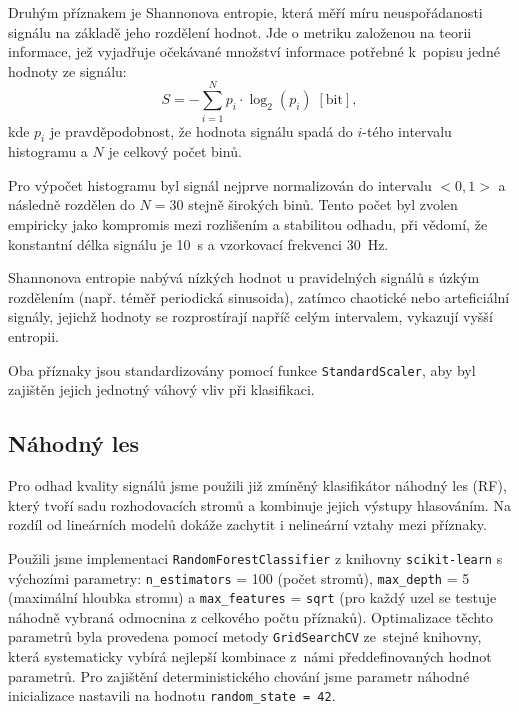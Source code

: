 Druhým příznakem je Shannonova entropie, která měří míru neuspořádanosti signálu na základě jeho rozdělení hodnot.
Jde o metriku založenou na teorii informace, jež vyjadřuje očekávané množství informace potřebné k~popisu jedné hodnoty ze signálu:
\begin{equation}
	\label{eq:shannon_entropy}
	S = - \sum_{i=1}^{N} p_i \cdot \log_2(p_i) \; [\text{bit}],
\end{equation}
kde $p_i$ je pravděpodobnost, že hodnota signálu spadá do $i$-tého intervalu histogramu a $N$ je celkový počet binů.

Pro výpočet histogramu byl signál nejprve normalizován do intervalu $< 0, 1 >$ a následně rozdělen do $N = 30$ stejně širokých binů.
Tento počet byl zvolen empiricky jako kompromis mezi rozlišením a stabilitou odhadu, při vědomí, že konstantní délka signálu je 10~s a vzorkovací frekvenci 30~Hz.

Shannonova entropie nabývá nízkých hodnot u pravidelných signálů s úzkým rozdělením (např. téměř periodická sinusoida),
zatímco chaotické nebo arteficiální signály, jejichž hodnoty se rozprostírají napříč celým intervalem, vykazují vyšší entropii.

Oba příznaky jsou standardizovány pomocí funkce \texttt{StandardScaler}, aby byl zajištěn jejich jednotný váhový vliv při klasifikaci.

\subsection*{Náhodný les}
\label{subsec:random_forest}
Pro odhad kvality signálů jsme použili již zmíněný klasifikátor náhodný les (\acs{RF}), který tvoří sadu rozhodovacích stromů a kombinuje jejich výstupy hlasováním.
Na rozdíl od lineárních modelů dokáže zachytit i nelineární vztahy mezi příznaky.

Použili jsme implementaci \texttt{RandomForestClassifier} z knihovny \texttt{scikit-learn} s výchozími parametry: \texttt{n\_estimators} = 100 (počet stromů), \texttt{max\_depth} = 5 (maximální hloubka stromu) a \texttt{max\_features} = \texttt{sqrt} (pro každý uzel se testuje náhodně vybraná odmocnina z celkového počtu příznaků).
Optimalizace těchto parametrů byla provedena pomocí metody \texttt{GridSearchCV} ze~stejné knihovny, která systematicky vybírá nejlepší kombinace z~námi předdefinovaných hodnot parametrů.
Pro zajištění deterministického chování jsme parametr náhodné inicializace nastavili na hodnotu \texttt{random\_state = 42}.

